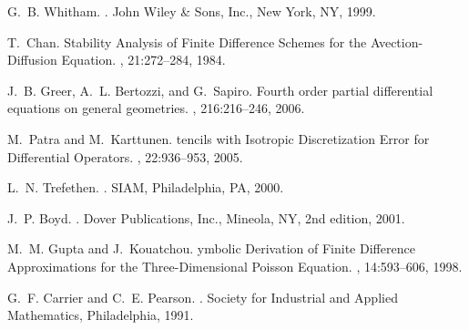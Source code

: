 \documentclass[fleqn,12pt,twoside]{article}
\begin{document}
\begin{thebibliography}{10}
G.~B. Whitham.
.
\newblock John Wiley \& Sons, Inc., New York, NY, 1999.

T.~Chan.
\newblock Stability {A}nalysis of {F}inite {D}ifference {S}chemes for the
  {A}vection-{D}iffusion {E}quation.
, 21:272--284, 1984.

J.~B. Greer, A.~L. Bertozzi, and G.~Sapiro.
\newblock Fourth order partial differential equations on general geometries.
, 216:216--246, 2006.

M.~Patra and M.~Karttunen.
tencils with {I}sotropic {D}iscretization {E}rror for
  {D}ifferential {O}perators.
, 22:936--953, 2005.

L.~N. Trefethen.
.
\newblock SIAM, Philadelphia, PA, 2000.

J.~P. Boyd.
.
\newblock Dover Publications, Inc., Mineola, NY, 2nd edition, 2001.

M.~M. Gupta and J.~Kouatchou.
ymbolic {D}erivation of {F}inite {D}ifference {A}pproximations for
  the {T}hree-{D}imensional {P}oisson {E}quation.
, 14:593--606, 1998.

G.~F. Carrier and C.~E. Pearson.
.
\newblock Society for Industrial and Applied Mathematics, Philadelphia, 1991.

\end{thebibliography}
\end{document}
